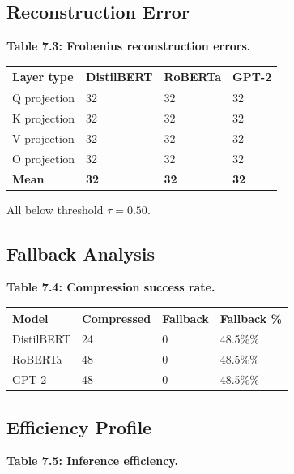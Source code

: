 \subsection{Reconstruction Error}

\textbf{Table 7.3: Frobenius reconstruction errors.}

\begin{table}[H]
\centering
\small
\begin{tabular}{llll}
\toprule
\textbf{Layer type} & \textbf{DistilBERT} & \textbf{RoBERTa} & \textbf{GPT-2} \\
\midrule
Q projection & 32 & 32 & 32 \\
K projection & 32 & 32 & 32 \\
V projection & 32 & 32 & 32 \\
O projection & 32 & 32 & 32 \\
\textbf{Mean} & \textbf{32} & \textbf{32} & \textbf{32} \\
\bottomrule
\end{tabular}
\end{table}

All below threshold $\tau = 0.50$.

\subsection{Fallback Analysis}

\textbf{Table 7.4: Compression success rate.}

\begin{table}[H]
\centering
\small
\begin{tabular}{llll}
\toprule
\textbf{Model} & \textbf{Compressed} & \textbf{Fallback} & \textbf{Fallback \%} \\
\midrule
DistilBERT & 24 & 0 & 48.5\%\% \\
RoBERTa & 48 & 0 & 48.5\%\% \\
GPT-2 & 48 & 0 & 48.5\%\% \\
\bottomrule
\end{tabular}
\end{table}

\subsection{Efficiency Profile}

\textbf{Table 7.5: Inference efficiency.}

